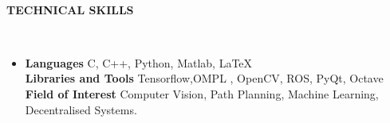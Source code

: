 \documentclass[a4paper,8pt]{article}
\newcommand{\lsep}{-0.5cm}
\newcommand{\resheading}[1]{{\small \colorbox{mygrey}{\begin{minipage}{0.975\textwidth}{\textbf{#1 \vphantom{p\^{E}}}}\end{minipage}}}}
\begin{document}
\hspace{0.5cm}\\[-0.2cm]
\resheading{\textbf{TECHNICAL SKILLS} }\\[\lsep]
\begin{itemize}
\item \noindent \textbf{Languages} C, C++, Python, Matlab, {\LaTeX{}} \\
\textbf{Libraries and Tools} Tensorflow,OMPL , OpenCV, ROS, PyQt, Octave \\
\textbf{Field of Interest} Computer Vision, Path Planning, Machine Learning, Decentralised Systems. \\
\end{itemize}
\end{document}
